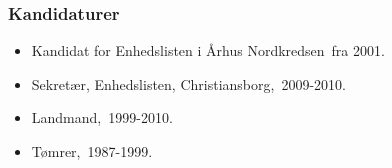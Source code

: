 \documentclass[11pt, a4paper]{awesome-cv}
\begin{document}
\begin{cvletter}
\subsubsection*{Kandidaturer}
\begin{itemize}
\item Kandidat for Enhedslisten i Århus Nordkredsen fra 2001.
\end{itemize}
\begin{itemize}
\item Sekretær, Enhedslisten, Christiansborg, 2009-2010.
\item Landmand, 1999-2010.
\item Tømrer, 1987-1999.
\end{itemize}
\end{cvletter}
\end{document}
